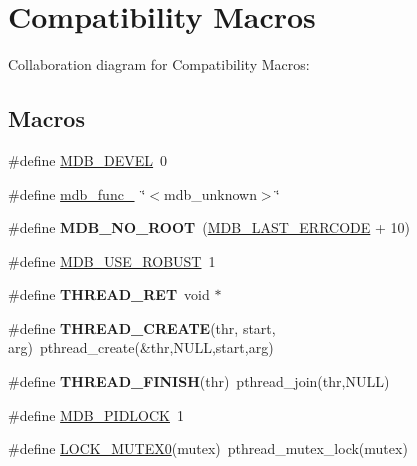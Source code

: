 \hypertarget{group__compat}{}\section{Compatibility Macros}
\label{group__compat}
Collaboration diagram for Compatibility Macros\+:
\subsection*{Macros}
\begin{DoxyCompactItemize}
\item 
\#define \mbox{\hyperlink{group__compat_ga103b045068a1d21bf2347a7342f8f486}{M\+D\+B\+\_\+\+D\+E\+V\+EL}}~0
\item 
\#define \mbox{\hyperlink{group__compat_ga506f7f49894aad220a0b158acd6eb276}{mdb\+\_\+func\+\_\+}}~\char`\"{}$<$mdb\+\_\+unknown$>$\char`\"{}
\item 
\mbox{\label{group__compat_gab05625b0afb362c41d373c5b0f5cd251}} 
\#define {\bfseries M\+D\+B\+\_\+\+N\+O\+\_\+\+R\+O\+OT}~(\mbox{\hyperlink{group__errors_ga4577d36100db836719f5c304a1fb5cc6}{M\+D\+B\+\_\+\+L\+A\+S\+T\+\_\+\+E\+R\+R\+C\+O\+DE}} + 10)
\item 
\#define \mbox{\hyperlink{group__compat_ga762689bed126eec67a19609b8e73908e}{M\+D\+B\+\_\+\+U\+S\+E\+\_\+\+R\+O\+B\+U\+ST}}~1
\item 
\mbox{\label{group__compat_ga4c4cf564e25b1a938d2928c8a2cf3474}} 
\#define {\bfseries T\+H\+R\+E\+A\+D\+\_\+\+R\+ET}~void $\ast$
\item 
\mbox{\label{group__compat_ga3ebb773d805887884ff9de2bf911d264}} 
\#define {\bfseries T\+H\+R\+E\+A\+D\+\_\+\+C\+R\+E\+A\+TE}(thr,  start,  arg)~pthread\+\_\+create(\&thr,N\+U\+LL,start,arg)
\item 
\mbox{\label{group__compat_ga6e8d1bca0edf5ef333c0f8b8a8e945c8}} 
\#define {\bfseries T\+H\+R\+E\+A\+D\+\_\+\+F\+I\+N\+I\+SH}(thr)~pthread\+\_\+join(thr,N\+U\+LL)
\item 
\#define \mbox{\hyperlink{group__compat_ga074373701b95aeaf38530ad7f9970030}{M\+D\+B\+\_\+\+P\+I\+D\+L\+O\+CK}}~1
\item 
\#define \mbox{\hyperlink{group__compat_gac26452435f8ed1bce951b254b436d8d0}{L\+O\+C\+K\+\_\+\+M\+U\+T\+E\+X0}}(mutex)~pthread\+\_\+mutex\+\_\+lock(mutex)

\end{DoxyCompactItemize}
